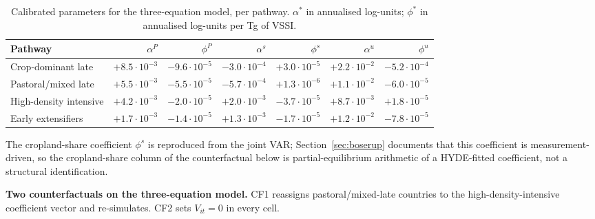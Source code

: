 \documentclass[11pt,letterpaper]{article}
\begin{document}
\begin{table}[H]
\centering
\caption{Calibrated parameters for the three-equation model, per pathway. $\alpha^*$ in annualised log-units; $\phi^*$ in annualised log-units per Tg of VSSI.}
\label{tab:struct-params}
\small
\begin{tabular}{lrrrrrr}
\toprule
Pathway & $\alpha^P$ & $\phi^P$ & $\alpha^s$ & $\phi^s$ & $\alpha^u$ & $\phi^u$ \\
\midrule
Crop-dominant late      & $+8.5\!\cdot\!10^{-3}$ & $-9.6\!\cdot\!10^{-5}$ & $-3.0\!\cdot\!10^{-4}$ & $+3.0\!\cdot\!10^{-5}$ & $+2.2\!\cdot\!10^{-2}$ & $-5.2\!\cdot\!10^{-4}$ \\
Pastoral/mixed late     & $+5.5\!\cdot\!10^{-3}$ & $-5.5\!\cdot\!10^{-5}$ & $-5.7\!\cdot\!10^{-4}$ & $+1.3\!\cdot\!10^{-6}$ & $+1.1\!\cdot\!10^{-2}$ & $-6.0\!\cdot\!10^{-5}$ \\
High-density intensive  & $+4.2\!\cdot\!10^{-3}$ & $-2.0\!\cdot\!10^{-5}$ & $+2.0\!\cdot\!10^{-3}$ & $-3.7\!\cdot\!10^{-5}$ & $+8.7\!\cdot\!10^{-3}$ & $+1.8\!\cdot\!10^{-5}$ \\
Early extensifiers      & $+1.7\!\cdot\!10^{-3}$ & $-1.4\!\cdot\!10^{-5}$ & $+1.3\!\cdot\!10^{-3}$ & $-1.7\!\cdot\!10^{-5}$ & $+1.2\!\cdot\!10^{-2}$ & $-7.8\!\cdot\!10^{-5}$ \\
\bottomrule
\end{tabular}
\par\smallskip\footnotesize{The cropland-share coefficient $\phi^s$ is reproduced from the joint VAR; Section~\ref{sec:boserup} documents that this coefficient is measurement-driven, so the cropland-share column of the counterfactual below is partial-equilibrium arithmetic of a HYDE-fitted coefficient, not a structural identification.}
\end{table}

\textbf{Two counterfactuals on the three-equation model.} CF1 reassigns pastoral/mixed-late countries to the high-density-intensive coefficient vector and re-simulates. CF2 sets $V_{it} = 0$ in every cell.
\end{document}
